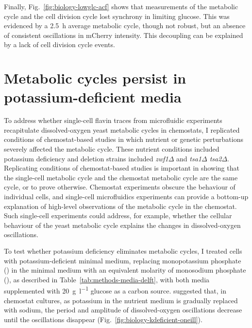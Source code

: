 Finally, Fig.\ \ref{fig:biology-lowglc-acf} shows that measurements of the metabolic cycle and the cell division cycle lost synchrony in limiting glucose.
This was evidenced by a \SI{2.5}{\hour} average metabolic cycle, though not robust, but an absence of consistent oscillations in mCherry intensity.
This decoupling can be explained by a lack of cell division cycle events.




\section{Metabolic cycles persist in potassium-deficient media}
\label{sec:biology-potassium_deficient}

To address whether single-cell flavin traces from microfluidic experiments recapitulate dissolved-oxygen yeast metabolic cycles in chemostats, I replicated conditions of chemostat-based studies in which nutrient or genetic perturbations severely affected the metabolic cycle.
These nutrient conditions included potassium deficiency and deletion strains included \textit{zwf1$\Delta$} and \textit{tsa1$\Delta$ tsa2$\Delta$}.
Replicating conditions of chemostat-based studies is important in showing that the single-cell metabolic cycle and the chemostat metabolic cycle are the same cycle, or to prove otherwise.
Chemostat experiments obscure the behaviour of individual cells, and single-cell microfluidics experiments can provide a bottom-up explanation of high-level observations of the metabolic cycle in the chemostat. Such single-cell experiments could address, for example, whether the cellular behaviour of the yeast metabolic cycle explains the changes in dissolved-oxygen oscillations.

To test whether potassium deficiency eliminates metabolic cycles, I treated cells with potassium-deficient minimal medium, replacing monopotassium phosphate () in the minimal medium with an equivalent molarity of monosodium phosphate (), as described in Table~\ref{tab:methods-media-delft}, with both media supplemented with \SI{20}{\gram~\litre^{-1}} glucose as a carbon source.
\textcite{oneillEukaryoticCellBiology2020} suggested that, in chemostat cultures, as potassium in the nutrient medium is gradually replaced with sodium, the period and amplitude of dissolved-oxygen oscillations decrease until the oscillations disappear (Fig.\ \ref{fig:biology-kdeficient-oneill}).

